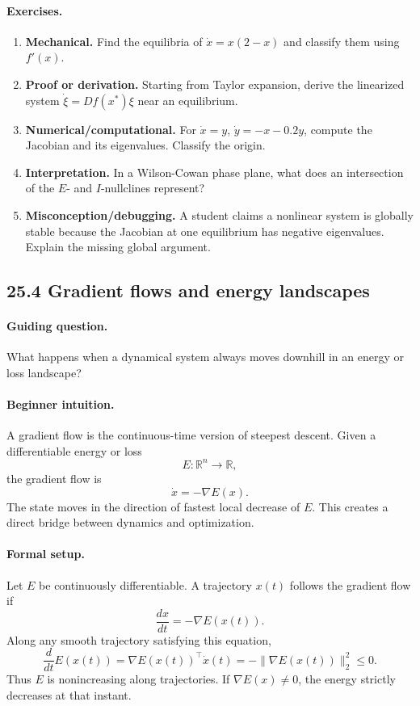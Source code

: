 \paragraph{Exercises.}
\begin{enumerate}[label=\textbf{25.3.\arabic*.}, leftmargin=*]
\item \textbf{Mechanical.} Find the equilibria of \(\dot x=x(2-x)\) and classify them using \(f'(x)\).
\item \textbf{Proof or derivation.} Starting from Taylor expansion, derive the linearized system \(\dot \xi=Df(x^*)\xi\) near an equilibrium.
\item \textbf{Numerical/computational.} For \(\dot x=y\), \(\dot y=-x-0.2y\), compute the Jacobian and its eigenvalues. Classify the origin.
\item \textbf{Interpretation.} In a Wilson-Cowan phase plane, what does an intersection of the \(E\)- and \(I\)-nullclines represent?
\item \textbf{Misconception/debugging.} A student claims a nonlinear system is globally stable because the Jacobian at one equilibrium has negative eigenvalues. Explain the missing global argument.
\end{enumerate}

\subsection{25.4 Gradient flows and energy landscapes}

\paragraph{Guiding question.}
What happens when a dynamical system always moves downhill in an energy or loss landscape?

\paragraph{Beginner intuition.}
A gradient flow is the continuous-time version of steepest descent. Given a differentiable energy or loss
\[
E:\mathbb{R}^n\to\mathbb{R},
\]
the gradient flow is
\[
\dot x=-\nabla E(x).
\]
The state moves in the direction of fastest local decrease of \(E\). This creates a direct bridge between dynamics and optimization.

\paragraph{Formal setup.}
Let \(E\) be continuously differentiable. A trajectory \(x(t)\) follows the gradient flow if
\[
\frac{dx}{dt}=-\nabla E(x(t)).
\]
Along any smooth trajectory satisfying this equation,
\[
\frac{d}{dt}E(x(t))
=\nabla E(x(t))^\top \dot x(t)
=-\|\nabla E(x(t))\|_2^2
\leq 0.
\]
Thus \(E\) is nonincreasing along trajectories. If \(\nabla E(x)\neq 0\), the energy strictly decreases at that instant.

